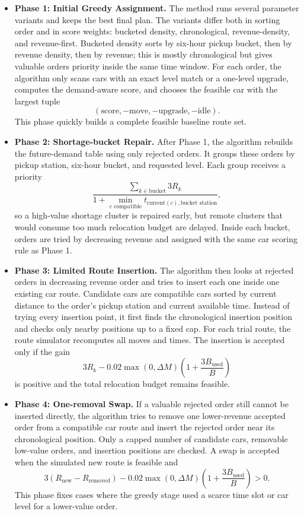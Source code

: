 \documentclass[10pt,a4paper]{article}
\begin{document}
\begin{itemize}
    \item \textbf{Phase 1: Initial Greedy Assignment.} The method runs several
    parameter variants and keeps the best final plan.  The variants differ both
    in sorting order and in score weights: bucketed density, chronological,
    revenue-density, and revenue-first.  Bucketed density sorts by six-hour
    pickup bucket, then by revenue density, then by revenue; this is mostly
    chronological but gives valuable orders priority inside the same time
    window.  For each order, the algorithm only scans cars with an exact level
    match or a one-level upgrade, computes the demand-aware score, and chooses
    the feasible car with the largest tuple
    \[
    (\text{score},-\text{move},-\text{upgrade},-\text{idle}).
    \]
    This phase quickly builds a complete feasible baseline route set.

    \item \textbf{Phase 2: Shortage-bucket Repair.} After Phase 1, the algorithm
    rebuilds the future-demand table using only rejected orders.  It groups
    these orders by pickup station, six-hour bucket, and requested level.  Each
    group receives a priority
    \[
    \frac{\sum_{k\in \text{bucket}}3R_k}
    {1+\min_{c\text{ compatible}}t_{\text{current}(c),\text{bucket station}}},
    \]
    so a high-value shortage cluster is repaired early, but remote clusters that
    would consume too much relocation budget are delayed.  Inside each bucket,
    orders are tried by decreasing revenue and assigned with the same car
    scoring rule as Phase 1.

    \item \textbf{Phase 3: Limited Route Insertion.} The algorithm then looks at
    rejected orders in decreasing revenue order and tries to insert each one
    inside one existing car route.  Candidate cars are compatible cars sorted by
    current distance to the order's pickup station and current available time.
    Instead of trying every insertion point, it first finds the chronological
    insertion position and checks only nearby positions up to a fixed cap.  For
    each trial route, the route simulator recomputes all moves and times.  The
    insertion is accepted only if the gain
    \[
    3R_k - 0.02\max(0,\Delta M)\left(1+\frac{3B_{\text{used}}}{B}\right)
    \]
    is positive and the total relocation budget remains feasible.

    \item \textbf{Phase 4: One-removal Swap.} If a valuable rejected order still
    cannot be inserted directly, the algorithm tries to remove one lower-revenue
    accepted order from a compatible car route and insert the rejected order
    near its chronological position.  Only a capped number of candidate cars,
    removable low-value orders, and insertion positions are checked.  A swap is
    accepted when the simulated new route is feasible and
    \[
    3(R_{\text{new}}-R_{\text{removed}})
    -0.02\max(0,\Delta M)\left(1+\frac{3B_{\text{used}}}{B}\right)>0.
    \]
    This phase fixes cases where the greedy stage used a scarce time slot or car
    level for a lower-value order.


\end{itemize}
\end{document}
